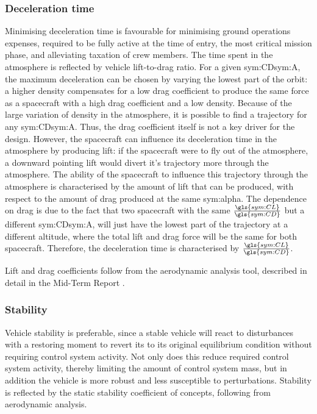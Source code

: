 \subsubsection{Deceleration time}
Minimising deceleration time is favourable for minimising ground operations expenses, required to be fully active at the time of entry, the most critical mission phase, and alleviating taxation of crew members. The time spent in the atmosphere is reflected by vehicle lift-to-drag ratio.  For a given \gls{sym:CD}\gls{sym:A}, the maximum deceleration can be chosen by varying the lowest part of the orbit: a higher density compensates for a low drag coefficient to produce the same force as a spacecraft with a high drag coefficient and a low density. Because of the large variation of density in the atmosphere, it is possible to find a trajectory for any \gls{sym:CD}\gls{sym:A}. Thus, the drag coefficient itself is not a key driver for the design. However, the spacecraft can influence its deceleration time in the atmosphere by producing lift: if the spacecraft were to fly out of the atmosphere, a downward pointing lift would divert it's trajectory more through the atmosphere. The ability of the spacecraft to influence this trajectory through the atmosphere is characterised by the amount of lift that can be produced, with respect to the amount of drag produced at the same \gls{sym:alpha}. The dependence on drag is due to the fact that two spacecraft with the same $\frac{\gls{sym:CL}}{\gls{sym:CD}}$ but a different \gls{sym:CD}\gls{sym:A}, will just have the lowest part of the trajectory at a different altitude, where the total lift and drag force will be the same for both spacecraft. Therefore, the deceleration time is characterised by $\frac{\gls{sym:CL}}{\gls{sym:CD}}$. 

Lift and drag coefficients follow from the aerodynamic analysis tool, described in detail in the Mid-Term Report \cite[p.34-46]{Balasooriyan2015b}.

\subsubsection{Stability}
Vehicle stability is preferable, since a stable vehicle will react to disturbances with a restoring moment to revert its to its original equilibrium condition without requiring control system activity. Not only does this reduce required control system activity, thereby limiting the amount of control system mass, but in addition the vehicle is more robust and less susceptible to perturbations. Stability is reflected by the static stability coefficient of concepts, following from aerodynamic analysis.

